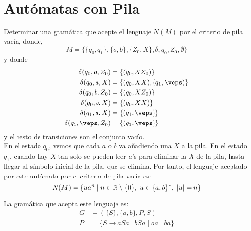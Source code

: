 \section{Autómatas con Pila}

\begin{ejercicio}\label{ej:1.5.1}
    Determinar una gramática que acepte el lenguaje $N(M)$ por el criterio de pila vacía, donde,
    \begin{equation*}
        M = \{\{q_0, q_1\}, \{a,b\}, \{Z_0,X\},\delta,q_0,Z_0,\emptyset \}
    \end{equation*}
    y donde
    \begin{align*}
        \delta(q_0,a,Z_0) &= \{(q_0, XZ_0)\} \\
        \delta(q_0,a,X) &= \{(q_0, XX),(q_1,\veps)\} \\
        \delta(q_0,b,Z_0) &= \{(q_0, XZ_0)\} \\
        \delta(q_0,b,X) &= \{(q_0, XX)\} \\
        \delta(q_1,a,X) &= \{(q_1, \veps)\} \\
        \delta(q_1,\veps,Z_0) &= \{(q_1, \veps)\} 
    \end{align*}
    y el resto de  transiciones son el conjunto vacío.\\

    En el estado $q_0$, vemos que cada $a$ o $b$ va añadiendo una $X$ a la pila. En el estado $q_1$, cuando hay $X$ tan solo se pueden leer $a$'s para eliminar la $X$ de la pila, hasta llegar al símbolo inicial de la pila, que se elimina. Por tanto, el lenguaje aceptado por este autómata por el criterio de pila vacía es:
    \begin{equation*}
        N(M) = \{ua^n\mid n\in \mathbb{N}\setminus \{0\},~u\in \{a,b\}^{\ast},~|u| = n\}
    \end{equation*}

    La gramática que acepta este lenguaje es:
    \begin{align*}
        G &= (\{S\},\{a,b\},P,S) \\
        P &= \{S\rightarrow aSa\mid bSa\mid aa\mid ba\}
    \end{align*}
\end{ejercicio}

